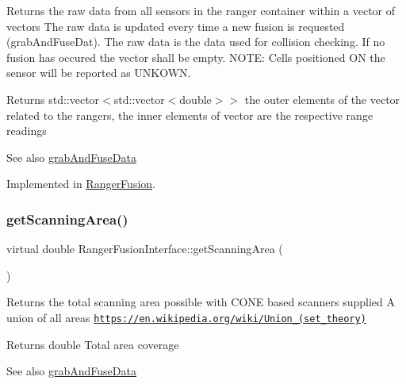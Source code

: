 Returns the raw data from all sensors in the ranger container within a vector of vectors The raw data is updated every time a new fusion is requested (grab\+And\+Fuse\+Dat). The raw data is the data used for collision checking. If no fusion has occured the vector shall be empty. N\+O\+TE\+: Cells positioned ON the sensor will be reported as U\+N\+K\+O\+WN. 

\begin{DoxyReturn}{Returns}
std\+::vector$<$std\+::vector$<$double$>$$>$ the outer elements of the vector related to the rangers, the inner elements of vector are the respective range readings
\end{DoxyReturn}
\begin{DoxySeeAlso}{See also}
\hyperlink{classRangerFusionInterface_ada6afdab2ce6d58a1bd0134f5e2be23f}{grab\+And\+Fuse\+Data} 
\end{DoxySeeAlso}


Implemented in \hyperlink{classRangerFusion_a5780383fdffe121a7a2372a047819ba9}{Ranger\+Fusion}.

\mbox{\label{classRangerFusionInterface_a65155605804376da4f67baf3c6f97f40}} 
\subsubsection{\texorpdfstring{get\+Scanning\+Area()}{getScanningArea()}}
{\footnotesize\ttfamily virtual double Ranger\+Fusion\+Interface\+::get\+Scanning\+Area (\begin{DoxyParamCaption}{ }\end{DoxyParamCaption})\hspace{0.3cm}{\ttfamily [pure virtual]}}



Returns the total scanning area possible with C\+O\+NE based scanners supplied A union of all areas \href{https://en.wikipedia.org/wiki/Union_(set_theory)}{\tt https\+://en.\+wikipedia.\+org/wiki/\+Union\+\_\+(set\+\_\+theory)} 

\begin{DoxyReturn}{Returns}
double Total area coverage
\end{DoxyReturn}
\begin{DoxySeeAlso}{See also}
\hyperlink{classRangerFusionInterface_ada6afdab2ce6d58a1bd0134f5e2be23f}{grab\+And\+Fuse\+Data} 
\end{DoxySeeAlso}


